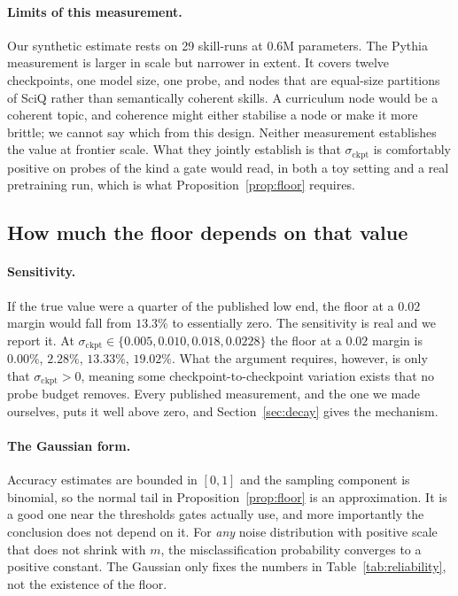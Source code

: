 \documentclass[11pt]{article}
\theoremstyle{plain}
\theoremstyle{definition}
\theoremstyle{remark}
\begin{document}
\paragraph{Limits of this measurement.} Our synthetic estimate rests on 29
skill-runs at $0.6$M parameters. The Pythia measurement is larger in scale but
narrower in extent. It covers twelve checkpoints, one model size, one probe, and
nodes that are equal-size partitions of SciQ rather than semantically coherent
skills. A
curriculum node would be a coherent topic, and coherence might either stabilise a
node or make it more brittle; we cannot say which from this design. Neither
measurement establishes the value at frontier scale. What they jointly establish
is that $\sigma_{\text{ckpt}}$ is comfortably positive on probes of the kind a
gate would read, in both a toy setting and a real pretraining run, which is what
Proposition~\ref{prop:floor} requires.

\subsection{How much the floor depends on that value}

\paragraph{Sensitivity.} If the true value were a quarter of the published low
end, the floor at a $0.02$ margin would fall from $13.3\%$ to essentially zero.
The sensitivity is real and we report it. At $\sigma_{\text{ckpt}} \in \{0.005,
0.010, 0.018, 0.0228\}$ the floor at a $0.02$ margin is $0.00\%$, $2.28\%$,
$13.33\%$, $19.02\%$. What the argument requires, however, is only that
$\sigma_{\text{ckpt}} > 0$, meaning some checkpoint-to-checkpoint variation
exists that no probe budget removes. Every published measurement, and the one we
made ourselves, puts it well above zero, and Section~\ref{sec:decay} gives the
mechanism.

\paragraph{The Gaussian form.} Accuracy estimates are bounded in $[0,1]$ and the
sampling component is binomial, so the normal tail in
Proposition~\ref{prop:floor} is an approximation. It is a good one near the
thresholds gates actually use, and more importantly the conclusion does not
depend on it. For \emph{any} noise distribution with positive scale that does not
shrink with $m$, the misclassification probability converges to a positive
constant. The Gaussian only fixes the numbers in
Table~\ref{tab:reliability}, not the existence of the floor.
\end{document}
